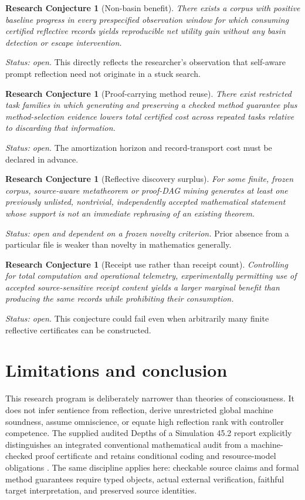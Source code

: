 \documentclass[11pt,letterpaper]{article}
\newtheorem{conjecture}[definition]{Research Conjecture}
\begin{document}
\begin{conjecture}[Non-basin benefit]
There exists a corpus with positive baseline progress in every prespecified observation window for which consuming certified reflective records yields reproducible net utility gain without any basin detection or escape intervention.
\end{conjecture}
\emph{Status: open.} This directly reflects the researcher's observation that self-aware prompt reflection need not originate in a stuck search.

\begin{conjecture}[Proof-carrying method reuse]
There exist restricted task families in which generating and preserving a checked method guarantee plus method-selection evidence lowers total certified cost across repeated tasks relative to discarding that information.
\end{conjecture}
\emph{Status: open.} The amortization horizon and record-transport cost must be declared in advance.

\begin{conjecture}[Reflective discovery surplus]
For some finite, frozen corpus, source-aware metatheorem or proof-DAG mining generates at least one previously unlisted, nontrivial, independently accepted mathematical statement whose support is not an immediate rephrasing of an existing theorem.
\end{conjecture}
\emph{Status: open and dependent on a frozen novelty criterion.} Prior absence from a particular file is weaker than novelty in mathematics generally.

\begin{conjecture}[Receipt use rather than receipt count]
Controlling for total computation and operational telemetry, experimentally permitting use of accepted source-sensitive receipt content yields a larger marginal benefit than producing the same records while prohibiting their consumption.
\end{conjecture}
\emph{Status: open.} This conjecture could fail even when arbitrarily many finite reflective certificates can be constructed.

\section{Limitations and conclusion}
This research program is deliberately narrower than theories of consciousness. It does not infer sentience from reflection, derive unrestricted global machine soundness, assume omniscience, or equate high reflection rank with controller competence. The supplied audited Depths of a Simulation 45.2 report explicitly distinguishes an integrated conventional mathematical audit from a machine-checked proof certificate and retains conditional coding and resource-model obligations \cite{depthsaudit}. The same discipline applies here: checkable source claims and formal method guarantees require typed objects, actual external verification, faithful target interpretation, and preserved source identities.
\end{document}

